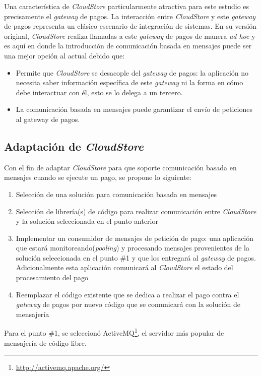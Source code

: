 \documentclass[article]{IEEEtran}
\begin{document}
Una característica de \emph{CloudStore} particularmente atractiva para este estudio es precisamente el \emph{gateway} de pagos. La interacción entre \emph{CloudStore} y este \emph{gateway} de pagos representa un clásico escenario de integración de sistemas. En su versión original, \emph{CloudStore} realiza llamadas a este \emph{gateway} de pagos de manera \emph{ad hoc} y es aquí en donde la introducción de comunicación basada en mensajes puede ser una mejor opción al actual debido que:
\begin{itemize}
    \item Permite que \emph{CloudStore} se desacople del \emph{gateway} de pagos: la aplicación no necesita saber información específica de este \emph{gateway} ni la forma en cómo debe interactuar con él, esto se lo delega a un tercero. 
    \item La comunicación basada en mensajes puede garantizar el envío de peticiones al gateway de pagos.
\end{itemize}

\subsection{Adaptación de \emph{CloudStore}}
Con el fin de adaptar \emph{CloudStore} para que soporte comunicación basada en mensajes cuando se ejecute un pago, se propone lo siguiente:
\begin{enumerate}
    \item Selección de una solución para comunicación basada en mensajes
    \item Selección de librería(s) de código para realizar comunicación entre \emph{CloudStore} y la solución seleccionada en el punto anterior
    \item Implementar un consumidor de mensajes de petición de pago: una aplicación que estará monitoreando(\emph{pooling}) y procesando mensajes provenientes de la solución seleccionada en el punto \#1 y que los entregará al \emph{gateway} de pagos. Adicionalmente esta aplicación comunicará al \emph{CloudStore} el estado del procesamiento del pago
    \item Reemplazar el código existente que se dedica a realizar el pago contra el \emph{gateway} de pagos por nuevo código que se comunicará con la solución de mensajería
\end{enumerate}

Para el punto \#1, se seleccionó ActiveMQ\footnote{\url{http://activemq.apache.org/}}, el servidor más popular de mensajería de código libre.
 
\end{document}
